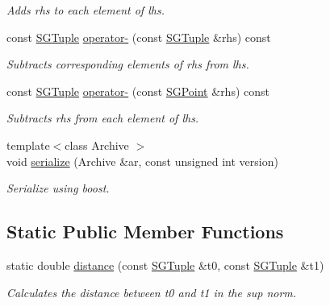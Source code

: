 \begin{DoxyCompactItemize}
\begin{DoxyCompactList}\small\item\em Adds rhs to each element of lhs. \end{DoxyCompactList}\item 
\hypertarget{classSGTuple_aca0dc9024f09628befbd25274366cb79}{const \hyperlink{classSGTuple}{S\-G\-Tuple} \hyperlink{classSGTuple_aca0dc9024f09628befbd25274366cb79}{operator-\/} (const \hyperlink{classSGTuple}{S\-G\-Tuple} \&rhs) const }\label{classSGTuple_aca0dc9024f09628befbd25274366cb79}

\begin{DoxyCompactList}\small\item\em Subtracts corresponding elements of rhs from lhs. \end{DoxyCompactList}\item 
\hypertarget{classSGTuple_a4b0d32414ed5e3df2e78c43d8bc72365}{const \hyperlink{classSGTuple}{S\-G\-Tuple} \hyperlink{classSGTuple_a4b0d32414ed5e3df2e78c43d8bc72365}{operator-\/} (const \hyperlink{classSGPoint}{S\-G\-Point} \&rhs) const }\label{classSGTuple_a4b0d32414ed5e3df2e78c43d8bc72365}

\begin{DoxyCompactList}\small\item\em Subtracts rhs from each element of lhs. \end{DoxyCompactList}\item 
\hypertarget{classSGTuple_a82a8b8ef3ee0f1ae72d49ad98b43bc54}{{\footnotesize template$<$class Archive $>$ }\\void \hyperlink{classSGTuple_a82a8b8ef3ee0f1ae72d49ad98b43bc54}{serialize} (Archive \&ar, const unsigned int version)}\label{classSGTuple_a82a8b8ef3ee0f1ae72d49ad98b43bc54}

\begin{DoxyCompactList}\small\item\em Serialize using boost. \end{DoxyCompactList}\end{DoxyCompactItemize}
\subsection*{Static Public Member Functions}
\begin{DoxyCompactItemize}
\item 
\hypertarget{classSGTuple_a84f49c6d705bbe457e0e74e32316d25b}{static double \hyperlink{classSGTuple_a84f49c6d705bbe457e0e74e32316d25b}{distance} (const \hyperlink{classSGTuple}{S\-G\-Tuple} \&t0, const \hyperlink{classSGTuple}{S\-G\-Tuple} \&t1)}\label{classSGTuple_a84f49c6d705bbe457e0e74e32316d25b}

\begin{DoxyCompactList}\small\item\em Calculates the distance between t0 and t1 in the sup norm. \end{DoxyCompactList}\end{DoxyCompactItemize}
